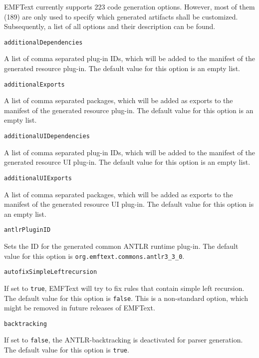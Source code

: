 EMFText currently supports 223 code generation options. However, most of them (189) are only used to specify which generated artifacts shall be customized. Subsequently, a list of all options and their description can be found.

\vspace{1cm}\noindent\texttt{additionalDependencies}
\begin{myindentpar}{1cm}
A list of comma separated plug-in IDs, which will be added to the manifest of the generated resource plug-in. The default value for this option is an empty list.
\end{myindentpar}

\noindent\texttt{additionalExports}
\begin{myindentpar}{1cm}
A list of comma separated packages, which will be added as exports to the manifest of the generated resource plug-in. The default value for this option is an empty list.
\end{myindentpar}

\noindent\texttt{additionalUIDependencies}
\begin{myindentpar}{1cm}
A list of comma separated plug-in IDs, which will be added to the manifest of the generated resource UI plug-in. The default value for this option is an empty list.
\end{myindentpar}

\noindent\texttt{additionalUIExports}
\begin{myindentpar}{1cm}
A list of comma separated packages, which will be added as exports to the manifest of the generated resource UI plug-in. The default value for this option is an empty list.
\end{myindentpar}

\noindent\texttt{antlrPluginID}
\begin{myindentpar}{1cm}
Sets the ID for the generated common ANTLR runtime plug-in. The default value for this option is \texttt{org.emftext.commons.antlr3\_3\_0}.
\end{myindentpar}

\noindent\texttt{autofixSimpleLeftrecursion}
\begin{myindentpar}{1cm}
If set to \texttt{true}, EMFText will try to fix rules that contain simple left recursion. The default value for this option is \texttt{false}. This is a non-standard option, which might be removed in future releases of EMFText.
\end{myindentpar}

\noindent\texttt{backtracking}
\begin{myindentpar}{1cm}
If set to \texttt{false}, the ANTLR-backtracking is deactivated for parser generation. The default value for this option is \texttt{true}.
\end{myindentpar}

